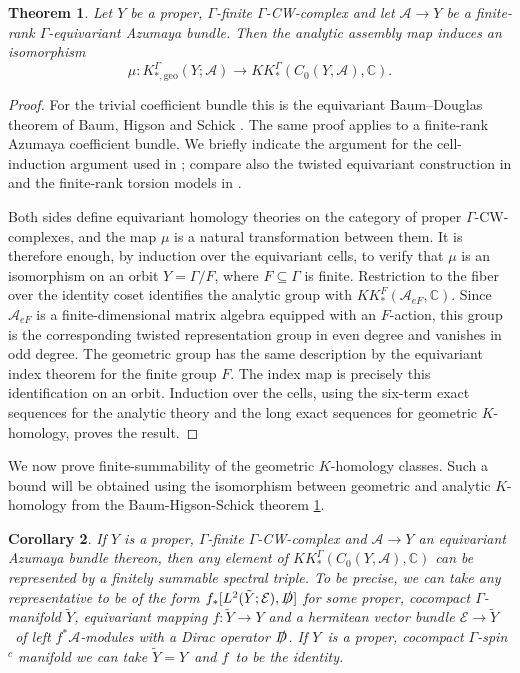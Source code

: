 \documentclass[a4paper,reqno]{amsart}
\numberwithin{equation}{section}
\def\C{\mathbb{C}}
\newtheorem{thm}{Theorem}[section]
\newtheorem{cor}[thm]{Corollary}
\theoremstyle{definition}
\theoremstyle{remark}
\begin{document}
\begin{thm}
\label{bhsthem}
Let $Y$ be a proper, $\Gamma$-finite $\Gamma$-CW-complex and let $\mathcal A\to Y$ be a finite-rank $\Gamma$-equivariant Azumaya bundle. Then the analytic assembly map induces an isomorphism
\[\mu:K^{\Gamma}_{*,\mathrm{geo}}(Y;\mathcal A)\longrightarrow KK^\Gamma_*(C_0(Y,\mathcal A),\mathbb C).\]
\end{thm}

\begin{proof}
For the trivial coefficient bundle this is the equivariant Baum--Douglas theorem of Baum, Higson and Schick \cite{BaumHigsonSchick2010}. The same proof applies to a finite-rank Azumaya coefficient bundle. We briefly indicate the argument for the cell-induction argument used in \cite{BaumHigsonSchick2010}; compare also the twisted equivariant construction in \cite{Barcenas2020} and the finite-rank torsion models in \cite{BaumCareyWang2013,DeeleyGoffeng2017}.

Both sides define equivariant homology theories on the category of proper $\Gamma$-CW-complexes, and the map $\mu$ is a natural transformation between them. It is therefore enough, by induction over the equivariant cells, to verify that $\mu$ is an isomorphism on an orbit $Y=\Gamma/F$, where $F\subseteq\Gamma$ is finite. Restriction to the fiber over the identity coset identifies the analytic group with $KK^F_*(\mathcal A_{eF},\mathbb C)$. Since $\mathcal A_{eF}$ is a finite-dimensional matrix algebra equipped with an $F$-action, this group is the corresponding twisted representation group in even degree and vanishes in odd degree. The geometric group has the same description by the equivariant index theorem for the finite group $F$. The index map is precisely this identification on an orbit. Induction over the
cells, using the six-term exact sequences for the analytic theory and the long exact sequences for geometric $K$-homology, proves the result.
\end{proof}








We now prove finite-summability of the geometric $K$-homology classes. Such a bound will be obtained using the isomorphism between geometric and analytic $K$-homology from the Baum-Higson-Schick theorem \ref{bhsthem}.





\begin{cor}
\label{finintesadmaodm}
If $Y$ is a proper, $\Gamma$-finite $\Gamma$-CW-complex and $\mathcal{A}\to Y$ an equivariant Azumaya bundle thereon, then any element of $KK_*^\Gamma(C_0(Y,\mathcal{A}),\C)$ can be represented by a finitely summable spectral triple. To be precise, we can take any representative to be of the form $f_*[L^2(\tilde{Y};\mathcal{E}),\slashed{D}]$ for some proper, cocompact $\Gamma$-manifold $\tilde{Y}$, equivariant mapping $f:\tilde{Y}\to Y$ and a hermitean vector bundle $\mathcal{E}\to \tilde{Y}$ of left $f^*\mathcal{A}$-modules with a Dirac operator $\slashed{D}$. If $Y$ is a proper, cocompact $\Gamma$-spin$^c$ manifold we can take $\tilde{Y}=Y$ and $f$ to be the identity. 
\end{cor}
\end{document}
